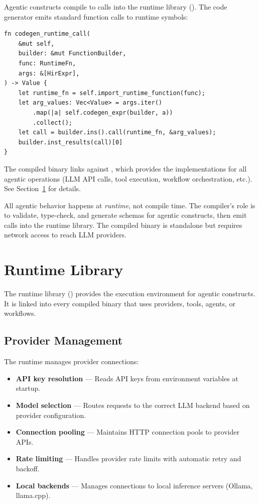 Agentic constructs compile to calls into the \haira{} runtime library (). The code generator emits standard function calls to runtime symbols:

\begin{lstlisting}[language={}]
fn codegen_runtime_call(
    &mut self,
    builder: &mut FunctionBuilder,
    func: RuntimeFn,
    args: &[HirExpr],
) -> Value {
    let runtime_fn = self.import_runtime_function(func);
    let arg_values: Vec<Value> = args.iter()
        .map(|a| self.codegen_expr(builder, a))
        .collect();
    let call = builder.ins().call(runtime_fn, &arg_values);
    builder.inst_results(call)[0]
}
\end{lstlisting}

The compiled binary links against , which provides the implementations for all agentic operations (LLM API calls, tool execution, workflow orchestration, etc.). See Section~\ref{sec:runtime} for details.

\begin{note}
All agentic behavior happens at \emph{runtime}, not compile time. The compiler's role is to validate, type-check, and generate schemas for agentic constructs, then emit calls into the runtime library. The compiled binary is standalone but requires network access to reach LLM providers.
\end{note}

\section{Runtime Library}
\label{sec:runtime}

The \haira{} runtime library () provides the execution environment for agentic constructs. It is linked into every compiled \haira{} binary that uses providers, tools, agents, or workflows.

\subsection{Provider Management}

The runtime manages provider connections:

\begin{itemize}
    \item \textbf{API key resolution} --- Reads API keys from environment variables at startup.
    \item \textbf{Model selection} --- Routes requests to the correct LLM backend based on provider configuration.
    \item \textbf{Connection pooling} --- Maintains HTTP connection pools to provider APIs.
    \item \textbf{Rate limiting} --- Handles provider rate limits with automatic retry and backoff.
    \item \textbf{Local backends} --- Manages connections to local inference servers (Ollama, llama.cpp).
\end{itemize}

